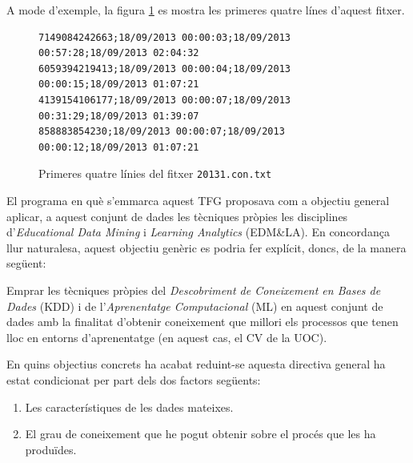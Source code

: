 \documentclass[
	a4paper,
	twoside,
	justified
]{tufte-book}
\begin{document}
A mode d'exemple, la figura \ref{20131.con.txt_head} es mostra les primeres quatre línes d'aquest fitxer. 

\begin{figure}
\begin{verbatim}
7149084242663;18/09/2013 00:00:03;18/09/2013 00:57:28;18/09/2013 02:04:32
6059394219413;18/09/2013 00:00:04;18/09/2013 00:00:15;18/09/2013 01:07:21
4139154106177;18/09/2013 00:00:07;18/09/2013 00:31:29;18/09/2013 01:39:07
858883854230;18/09/2013 00:00:07;18/09/2013 00:00:12;18/09/2013 01:07:21
\end{verbatim}
\caption{
	\label{20131.con.txt_head}
	Primeres quatre línies del fitxer \texttt{20131.con.txt}
}
\end{figure}

El programa en què s'emmarca aquest TFG proposava com a objectiu general aplicar, a aquest conjunt de dades les tècniques pròpies les disciplines d'\emph{Educational Data Mining} i \emph{Learning Analytics} (EDM\&LA). En concordança llur naturalesa, aquest objectiu genèric es podria fer explícit, doncs, de la manera següent:

\begin{shaded}
  Emprar les tècniques pròpies del \emph{Descobriment de Coneixement en Bases de Dades} (KDD) i de l'\emph{Aprenentatge Computacional} (ML) en aquest conjunt de dades amb la finalitat d'obtenir coneixement que millori els processos que tenen lloc en entorns d'aprenentatge (en aquest cas, el CV de la UOC).      
\end{shaded}

En quins objectius concrets ha acabat reduint-se aquesta directiva general ha estat condicionat per part dels dos factors següents:

\begin{enumerate}[(1)]
\item Les característiques de les dades mateixes.
\item El grau de coneixement que he pogut obtenir sobre el procés que les ha produïdes. 
\end{enumerate}
\end{document}
